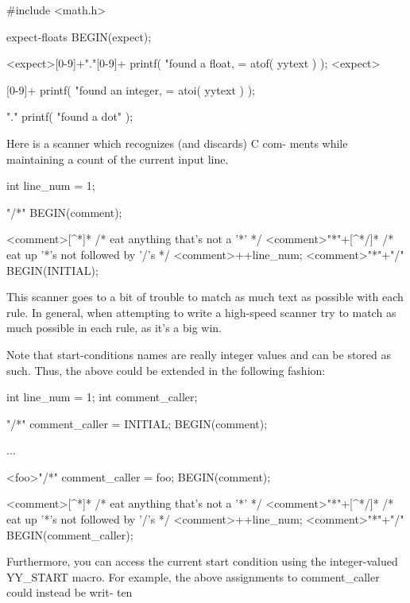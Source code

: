 \documentclass[12pt,spanish,twocolumn,lettersize]{article}
\begin{document}
	   #include <math.h>

	   expect-floats	BEGIN(expect);

	   <expect>[0-9]+"."[0-9]+	{
		       printf( "found a float, = %
			       atof( yytext ) );
		       }
	   <expect>

	   [0-9]+      {
		       printf( "found an integer, = %
			       atoi( yytext ) );
		       }

	   "."	       printf( "found a dot\n" );

       Here  is	 a scanner which recognizes (and discards) C com-
       ments while maintaining a count of the current input line.

		   int line_num = 1;

	   "/*"		BEGIN(comment);

	   <comment>[^*\n]*	   /* eat anything that's not a '*' */
	   <comment>"*"+[^*/\n]*   /* eat up '*'s not followed by '/'s */
	   <comment>\n		   ++line_num;
	   <comment>"*"+"/"	   BEGIN(INITIAL);

       This  scanner  goes  to	a bit of trouble to match as much
       text  as	 possible  with	 each  rule.   In  general,  when
       attempting  to  write a high-speed scanner try to match as
       much possible in each rule, as it's a big win.

       Note that start-conditions names are really integer values
       and  can	 be  stored  as	 such.	 Thus, the above could be
       extended in the following fashion:

		   int line_num = 1;
		   int comment_caller;

	   "/*"		{
			comment_caller = INITIAL;
			BEGIN(comment);
			}

	   ...

	   <foo>"/*"	{
			comment_caller = foo;
			BEGIN(comment);
			}

	   <comment>[^*\n]*	   /* eat anything that's not a '*' */
	   <comment>"*"+[^*/\n]*   /* eat up '*'s not followed by '/'s */
	   <comment>\n		   ++line_num;
	   <comment>"*"+"/"	   BEGIN(comment_caller);

       Furthermore, you can access the	current	 start	condition
       using the integer-valued YY_START macro.	 For example, the
       above assignments to comment_caller could instead be writ-
       ten
\end{document}
